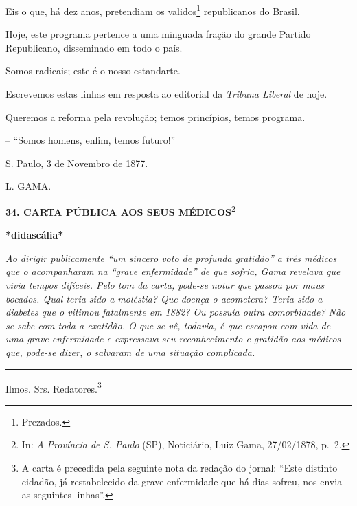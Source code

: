Eis o que, há dez anos, pretendiam os validos\footnote{Prezados.}
republicanos do Brasil.

Hoje, este programa pertence a uma minguada fração do grande Partido
Republicano, disseminado em todo o país.

Somos radicais; este é o nosso estandarte.

Escrevemos estas linhas em resposta ao editorial da \emph{Tribuna
Liberal} de hoje.

Queremos a reforma pela revolução; temos princípios, temos programa.

-- ``Somos homens, enfim, temos futuro!''

S. Paulo, 3 de Novembro de 1877.

L. GAMA.

\textbf{34. CARTA PÚBLICA AOS SEUS MÉDICOS}\footnote{In: \emph{A
  Província de S. Paulo} (SP), Noticiário, Luiz Gama, 27/02/1878, p.~2.}

\textbf{*didascália*}

\emph{Ao dirigir publicamente ``um sincero voto de profunda gratidão'' a
três médicos que o acompanharam na ``grave enfermidade'' de que sofria,
Gama revelava que vivia tempos difíceis. Pelo tom da carta, pode-se
notar que passou por maus bocados. Qual teria sido a moléstia? Que
doença o acometera? Teria sido a diabetes que o vitimou fatalmente em
1882? Ou possuía outra comorbidade? Não se sabe com toda a exatidão. O
que se vê, todavia, é que escapou com vida de uma grave enfermidade e
expressava seu reconhecimento e gratidão aos médicos que, pode-se dizer,
o salvaram de uma situação complicada.}

\begin{center}\rule{0.5\linewidth}{\linethickness}\end{center}

Ilmos. Srs. Redatores.\footnote{A carta é precedida pela seguinte nota
  da redação do jornal: ``Este distinto cidadão, já restabelecido da
  grave enfermidade que há dias sofreu, nos envia as seguintes linhas''.}

